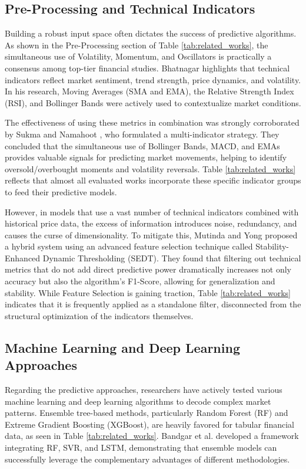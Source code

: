 \documentclass{ieeeaccess}
\begin{document}
\subsection{Pre-Processing and Technical Indicators}

Building a robust input space often dictates the success of predictive algorithms. As shown in the Pre-Processing section of Table \ref{tab:related_works}, the simultaneous use of Volatility, Momentum, and Oscillators is practically a consensus among top-tier financial studies. Bhatnagar \cite{mittal2025machine} highlights that technical indicators reflect market sentiment, trend strength, price dynamics, and volatility. In his research, Moving Averages (SMA and EMA), the Relative Strength Index (RSI), and Bollinger Bands were actively used to contextualize market conditions.

The effectiveness of using these metrics in combination was strongly corroborated by Sukma and Namahoot \cite{sukma2025enhancing}, who formulated a multi-indicator strategy. They concluded that the simultaneous use of Bollinger Bands, MACD, and EMAs provides valuable signals for predicting market movements, helping to identify oversold/overbought moments and volatility reversals. Table \ref{tab:related_works} reflects that almost all evaluated works incorporate these specific indicator groups to feed their predictive models.

However, in models that use a vast number of technical indicators combined with historical price data, the excess of information introduces noise, redundancy, and causes the curse of dimensionality. To mitigate this, Mutinda and Yong \cite{mutinda2026hybrid} proposed a hybrid system using an advanced feature selection technique called Stability-Enhanced Dynamic Thresholding (SEDT). They found that filtering out technical metrics that do not add direct predictive power dramatically increases not only accuracy but also the algorithm's F1-Score, allowing for generalization and stability. While Feature Selection is gaining traction, Table \ref{tab:related_works} indicates that it is frequently applied as a standalone filter, disconnected from the structural optimization of the indicators themselves.


\subsection{Machine Learning and Deep Learning Approaches}

Regarding the predictive approaches, researchers have actively tested various machine learning and deep learning algorithms to decode complex market patterns. Ensemble tree-based methods, particularly Random Forest (RF) and Extreme Gradient Boosting (XGBoost), are heavily favored for tabular financial data, as seen in Table \ref{tab:related_works}. Bandgar et al. \cite{bandgar2025finchronos} developed a framework integrating RF, SVR, and LSTM, demonstrating that ensemble models can successfully leverage the complementary advantages of different methodologies.
\end{document}
